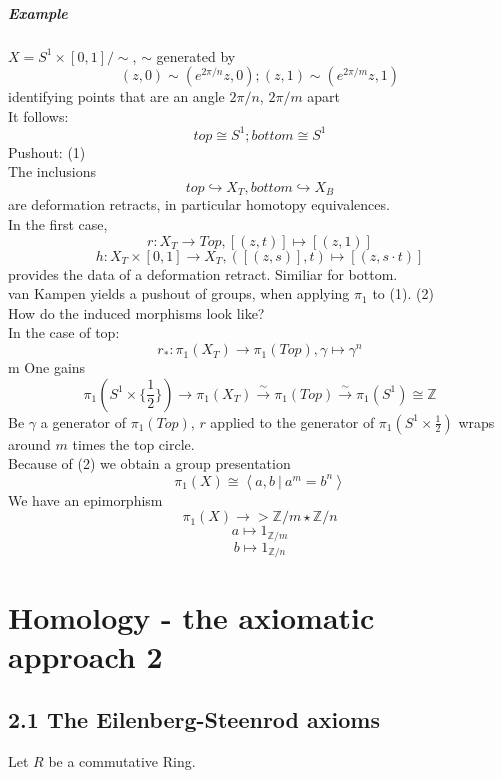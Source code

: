 \documentclass{book}
\newcommand{\Z}{\mathbb{Z}}
\begin{document}
\paragraph{Example}
$X = S^1\times [0,1]/\sim$, $\sim$ generated by
\[(z,0) \sim (e^{2\pi /n}z,0) ; (z,1) \sim (e^{2\pi /m}z,1) \]
identifying points that are  an angle $2\pi /n$, $2\pi/m$ apart\\
It follows:
\[top \cong S^1; bottom \cong S^1 \]
Pushout: (1)\\

The inclusions
\[top \hookrightarrow X_{T}, bottom \hookrightarrow X_B \]
are deformation retracts, in particular homotopy equivalences.\\

In the first case,
\[r: X_T \longrightarrow Top, [(z,t)] \longmapsto [(z,1)]\]
\[h: X_T\times [0,1]\longrightarrow X_T, ([(z,s)],t) \longmapsto [(z,s\cdot t)] \]
provides the data of a deformation retract. Similiar for bottom.\\

van Kampen yields a pushout of groups, when applying $\pi_1$ to (1).
(2)\\

How do the induced morphisms look like?\\
In the case of top:
\[r_* : \pi_1(X_T) \longrightarrow \pi_1(Top), \gamma \longmapsto \gamma^n \]m
One gains
\[\pi_1(S^1\times \{\frac{1}{2}\}) \longrightarrow \pi_1(X_T) \overset{\sim}{\longrightarrow} \pi_1(Top) \overset{\sim}{\longrightarrow} \pi_1(S^1) \cong \Z  \]
Be $\gamma$ a generator of $\pi_1(Top)$, $r$ applied to the generator of $\pi_1(S^1\times \frac{1}{2})$ wraps around $m$ times the top circle.\\

Because of (2) we obtain a group presentation
\[\pi_1(X) \cong \left\langle a,b~|~a^m = b^n \right\rangle \]
We have an epimorphism
\[\pi_1(X) \longrightarrow > \Z/m \star \Z /n \]
\[a \longmapsto 1_{\Z/m}\]
\[b \longmapsto 1_{\Z/n}\]

\newpage

\chapter{Homology - the axiomatic approach 2}

\section{2.1 The Eilenberg-Steenrod axioms}
Let $R$ be a commutative Ring.\\
\end{document}
